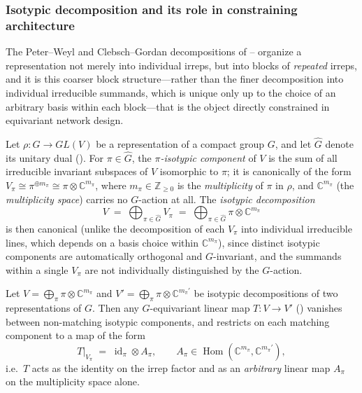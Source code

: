 \documentclass[mathematics,review,submit,moreauthors]{Definitions/mdpi}
\begin{document}

\subsubsection{Isotypic decomposition and its role in constraining architecture}\label{sec:isotypic-decomposition}

The Peter--Weyl and Clebsch--Gordan decompositions of
-- organize a
representation not merely into individual irreps, but into blocks of
\emph{repeated} irreps, and it is this coarser block structure---rather than
the finer decomposition into individual irreducible summands, which is
unique only up to the choice of an arbitrary basis within each block---that
is the object directly constrained in equivariant network design.

\begin{Definition}
\label{def:isotypic-decomposition}
Let $\rho : G \to GL(V)$ be a representation of a compact group $G$, and let
$\widehat{G}$ denote its unitary dual (). For
$\pi \in \widehat{G}$, the \emph{$\pi$-isotypic component} of $V$ is the sum
of all irreducible invariant subspaces of $V$ isomorphic to $\pi$; it is
canonically of the form $V_\pi \cong \pi^{\oplus m_\pi} \cong \pi \otimes
\mathbb{C}^{m_\pi}$, where $m_\pi \in \mathbb{Z}_{\geq 0}$ is the
\emph{multiplicity} of $\pi$ in $\rho$, and $\mathbb{C}^{m_\pi}$ (the
\emph{multiplicity space}) carries no $G$-action at all. The
\emph{isotypic decomposition}
\[
    V \;=\; \bigoplus_{\pi \in \widehat{G}} V_\pi \;=\; \bigoplus_{\pi \in \widehat{G}} \pi \otimes \mathbb{C}^{m_\pi}
\]
is then canonical (unlike the decomposition of each $V_\pi$ into individual
irreducible lines, which depends on a basis choice within
$\mathbb{C}^{m_\pi}$), since distinct isotypic components are automatically
orthogonal and $G$-invariant, and the summands within a single $V_\pi$ are
not individually distinguished by the $G$-action.
\end{Definition}

\begin{Proposition}
\label{prop:schur-blocks}
Let $V = \bigoplus_\pi \pi \otimes \mathbb{C}^{m_\pi}$ and
$V' = \bigoplus_\pi \pi \otimes \mathbb{C}^{m_\pi'}$ be isotypic
decompositions of two representations of $G$. Then any $G$-equivariant
linear map $T : V \to V'$ ()
vanishes between non-matching isotypic components, and restricts on each
matching component to a map of the form
\[
    T\big|_{V_\pi} \;=\; \operatorname{id}_\pi \otimes A_\pi, \qquad A_\pi \in \operatorname{Hom}(\mathbb{C}^{m_\pi}, \mathbb{C}^{m_\pi'}),
\]
i.e.\ $T$ acts as the identity on the irrep factor and as an
\emph{arbitrary} linear map $A_\pi$ on the multiplicity space alone.
\end{Proposition}
\end{document}
